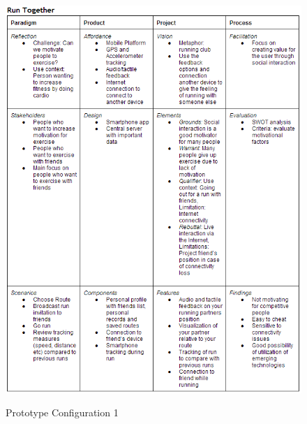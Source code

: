 \begin{figure}[ht!]
\begin{center}
 \label{fig:prototypeconfig1}
 \includegraphics[width=\textwidth]{img/prototypeconfig1.png}
 \caption{Prototype Configuration 1}
\end{center}
\end{figure}

